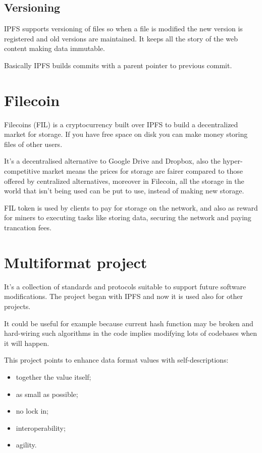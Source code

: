 \subsection{Versioning}
IPFS supports versioning of files so when a file is modified the new version is registered and old versions are maintained.
It keeps all the story of the web content making data immutable.

Basically IPFS builds commits with a parent pointer to previous commit.

\section{Filecoin}
Filecoins (FIL) is a cryptocurrency built over IPFS to build a decentralized market for storage.
If you have free space on disk you can make money storing files of other users.

It's a decentralised alternative to Google Drive and Dropbox, also the hyper-competitive market means the prices for storage are fairer compared to those offered by centralized alternatives, moreover in Filecoin, all the storage in the world that isn't being used can be put to use, instead of making new storage.

FIL token is used by clients to pay for storage on the network, and also as reward for miners to executing tasks like storing data, securing the network and paying trancation fees.

\section{Multiformat project}
It's a collection of standards and protocols suitable to support future software modifications.
The project began with IPFS and now it is used also for other projects.

It could be useful for example because current hash function may be broken and hard-wiring such algorithms in the code implies modifying lots of codebases when it will happen.

This project points to enhance data format values with self-descriptions:
\begin{itemize}
    \item together the value itself;
    \item as small as possible;
    \item no lock in;
    \item interoperability;
    \item agility.
\end{itemize}


